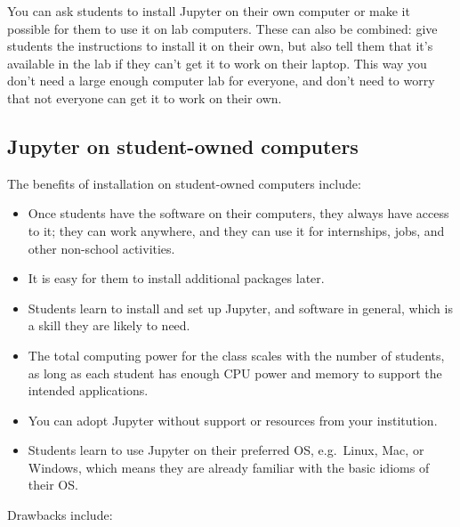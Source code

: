\documentclass[]{book}
\begin{document}
You can ask students to install Jupyter on their own computer or make it
possible for them to use it on lab computers. These can also be
combined: give students the instructions to install it on their own, but
also tell them that it's available in the lab if they can't get it to
work on their laptop. This way you don't need a large enough computer
lab for everyone, and don't need to worry that not everyone can get it
to work on their own.

\subsection{Jupyter on student-owned
computers}\label{jupyter-on-student-owned-computers}

The benefits of installation on student-owned computers include:

\begin{itemize}
\item
  Once students have the software on their computers, they always have
  access to it; they can work anywhere, and they can use it for
  internships, jobs, and other non-school activities.
\item
  It is easy for them to install additional packages later.
\item
  Students learn to install and set up Jupyter, and software in general,
  which is a skill they are likely to need.
\item
  The total computing power for the class scales with the number of
  students, as long as each student has enough CPU power and memory to
  support the intended applications.
\item
  You can adopt Jupyter without support or resources from your
  institution.
\item
  Students learn to use Jupyter on their preferred OS, e.g.~Linux, Mac,
  or Windows, which means they are already familiar with the basic
  idioms of their OS.
\end{itemize}

Drawbacks include:
\end{document}
